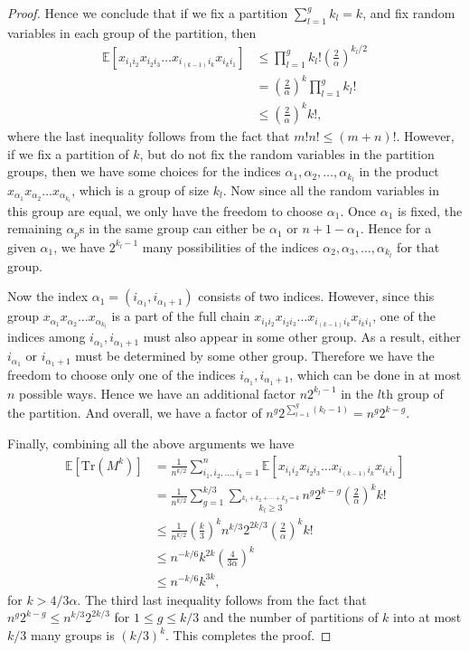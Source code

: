 \documentclass[12pt]{amsart}
\theoremstyle{plain}
\theoremstyle{definition}
\begin{document}
\begin{proof}
Hence we conclude that if we fix a partition $\sum_{l=1}^{g}k_{l} = k$, and fix random variables in each group of the partition, then
\begin{align*}
    \mathbb{E}[x_{i_{1}i_{2}}x_{i_{2}i_{3}} \dots x_{i_{(k-1)}i_{k}}x_{i_{k}i_{1}}] &\leq  \prod_{l=1}^{g}k_{l}!\left(\frac{2}{\alpha}\right)^{k_{l}/2}\\
    &=\left(\frac{2}{\alpha}\right)^{k}\prod_{l=1}^{g}k_{l}!\\
    &\leq \left(\frac{2}{\alpha}\right)^{k}k!,
\end{align*}
where the last inequality follows from the fact that $m!n!\leq (m+n)!.$
However, if we fix a partition of $k$, but do not fix the random variables in the partition groups, then we have some choices for the indices $\alpha_{1}, \alpha_{2}, \ldots, \alpha_{k_{l}}$ in the product $x_{\alpha_{1}}x_{\alpha_{2}}\ldots x_{\alpha_{k_{l}}}$, which is a group of size $k_{l}$. Now since all the random variables in this group are equal, we only have the freedom to choose $\alpha_{1}.$ Once $\alpha_{1}$ is fixed, the remaining $\alpha_{p}$s in the same group can either be $\alpha_{1}$ or $n+1 - \alpha_{1}$. Hence for a given $\alpha_{1}$, we have $2^{k_{l}-1}$ many possibilities of the indices $\alpha_{2}, \alpha_{3}, \ldots, \alpha_{k_{l}}$ for that group. 


Now the index $\alpha_{1}=(i_{\alpha_{1}}, i_{\alpha_{1}+1})$ consists of two indices. However, since this group $x_{\alpha_{1}}x_{\alpha_{2}}\ldots x_{\alpha_{k_{l}}}$ is a part of the full chain $x_{i_{1}i_{2}}x_{i_{2}i_{3}} \dots x_{i_{(k-1)}i_{k}}x_{i_{k}i_{1}}$, one of the indices among $i_{\alpha_{1}}, i_{\alpha_{1}+1}$ must also appear in some other group. As a result, either $i_{\alpha_{1}}$ or $i_{\alpha_{1}+1}$ must be determined by some other group. Therefore we have the freedom to choose only one of the indices $i_{\alpha_{1}}, i_{\alpha_{1}+1}$, which can be done in at most $n$ possible ways. Hence we have an additional factor $n2^{k_{l}-1}$ in the $l$th group of the partition. And overall, we have a factor of $n^{g}2^{\sum_{l=1}^{g}(k_{l}-1)}=n^{g}2^{k-g}.$


Finally, combining all the above arguments we have
\begin{align*}
    \mathbb{E}[\text{Tr}(M^{k})] &= \frac{1}{n^{ k/2 }}\sum_{i_{1},i_{2},\dots,i_{k}=1}^{n}\mathbb{E}[x_{i_{1}i_{2}}x_{i_{2}i_{3}} \dots x_{i_{(k-1)}i_{k}}x_{i_{k}i_{1}}]\\
    &=\frac{1}{n^{k/2}}\sum_{g=1}^{k/3}\sum_{\stackrel{k_{1}+k_{2}+\cdots+k_{g}=k}{k_{l}\geq 3}}n^g 2^{k-g}\left(\frac{2}{\alpha}\right)^{k}k!\\
    &\leq \frac{1}{n^{k/2}}\left(\frac{k}{3}\right)^{k}n^{k/3}2^{2k/3}\left(\frac{2}{\alpha}\right)^{k}k!\\
    &\leq n^{-k/6}k^{2k}\left(\frac{4}{3\alpha}\right)^{k}\\
    &\leq n^{-k/6}k^{3k},
\end{align*}
for $k>4/3\alpha$. The third last inequality follows from the fact that $n^g 2^{k-g}\leq n^{k/3}2^{2k/3}$ for $1\leq g\leq k/3$ and the number of partitions of $k$ into at most $k/3$ many groups is $(k/3)^{k}.$ This completes the proof.
\end{proof}
\end{document}
